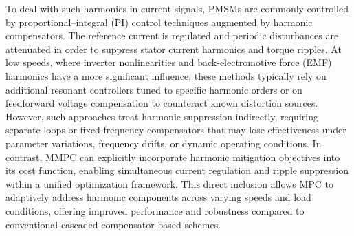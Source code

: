 To deal with such harmonics in current signals, PMSMs are commonly controlled by proportional–integral (PI) control techniques augmented by harmonic compensators. The reference current is regulated and periodic disturbances are attenuated in order to suppress stator current harmonics and torque ripples. At low speeds, where inverter nonlinearities and back-electromotive force (EMF) harmonics have a more significant influence, these methods typically rely on additional resonant controllers tuned to specific harmonic orders or on feedforward voltage compensation to counteract known distortion sources. However, such approaches treat harmonic suppression indirectly, requiring separate loops or fixed-frequency compensators that may lose effectiveness under parameter variations, frequency drifts, or dynamic operating conditions. In contrast, MMPC can explicitly incorporate harmonic mitigation objectives into its cost function, enabling simultaneous current regulation and ripple suppression within a unified optimization framework. This direct inclusion allows MPC to adaptively address harmonic components across varying speeds and load conditions, offering improved performance and robustness compared to conventional cascaded compensator-based schemes.


